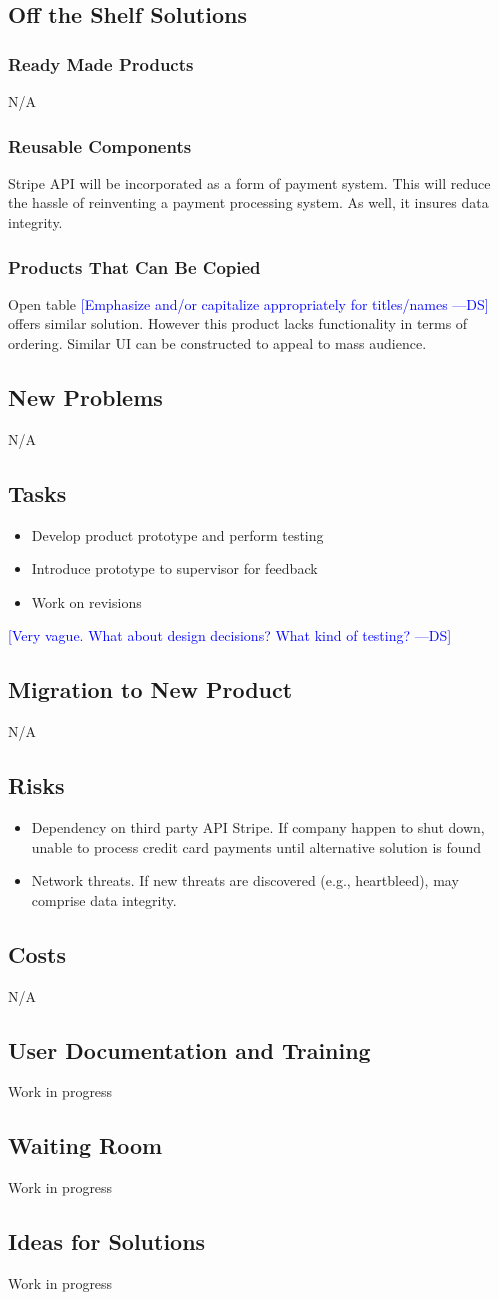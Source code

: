 \documentclass[12pt, titlepage]{article}
\newcommand{\authornote}[3]{\textcolor{#1}{[#3 ---#2]}}
\newcommand{\authornote}[3]{}
\newcommand{\ds}[1]{\authornote{blue}{DS}{#1}}
\begin{document}
\subsection{Off the Shelf Solutions}
\subsubsection{Ready Made Products}
N/A
\subsubsection{Reusable Components}
Stripe API will be incorporated as a form of payment system. This will reduce the hassle of reinventing a payment processing system. As well, it insures data integrity.
 \subsubsection{Products That Can Be Copied} 
Open table \ds{Emphasize and/or capitalize appropriately for titles/names} offers similar solution. However this product lacks functionality in terms of ordering. Similar UI can be constructed to appeal to mass audience.  
\subsection{New Problems}
N/A
\subsection{Tasks}
\begin{itemize}
  \item Develop product prototype and perform testing 
  \item Introduce prototype to supervisor for feedback
  \item 	Work on revisions
\end{itemize}
\ds{Very vague. What about design decisions? What kind of testing?}
\subsection{Migration to New Product}
N/A
\subsection{Risks}
\begin{itemize}
  \item Dependency on third party API Stripe. If company happen to shut down, unable to process credit card payments until alternative solution is found
  \item Network threats. If new threats are discovered (e.g., heartbleed), may comprise data integrity. 
\end{itemize}
\subsection{Costs}
N/A
\subsection{User Documentation and Training}
Work in progress
\subsection{Waiting Room}
Work in progress
\subsection{Ideas for Solutions}
Work in progress
\end{document}
